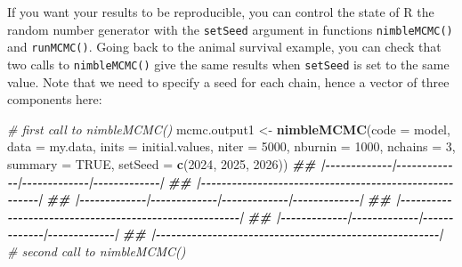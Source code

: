 \documentclass[
  12pt,
]{krantz}
\newenvironment{Shaded}{\begin{snugshade}}{\end{snugshade}}
\newcommand{\AttributeTok}[1]{\textcolor[rgb]{0.13,0.29,0.53}{#1}}
\newcommand{\CommentTok}[1]{\textcolor[rgb]{0.56,0.35,0.01}{\textit{#1}}}
\newcommand{\ConstantTok}[1]{\textcolor[rgb]{0.56,0.35,0.01}{#1}}
\newcommand{\DecValTok}[1]{\textcolor[rgb]{0.00,0.00,0.81}{#1}}
\newcommand{\DocumentationTok}[1]{\textcolor[rgb]{0.56,0.35,0.01}{\textbf{\textit{#1}}}}
\newcommand{\FunctionTok}[1]{\textcolor[rgb]{0.13,0.29,0.53}{\textbf{#1}}}
\newcommand{\NormalTok}[1]{#1}
\newcommand{\OtherTok}[1]{\textcolor[rgb]{0.56,0.35,0.01}{#1}}
\begin{document}
If you want your results to be reproducible, you can control the state of R the random number generator with the \texttt{setSeed} argument in functions \texttt{nimbleMCMC()} and \texttt{runMCMC()}. Going back to the animal survival example, you can check that two calls to \texttt{nimbleMCMC()} give the same results when \texttt{setSeed} is set to the same value. Note that we need to specify a seed for each chain, hence a vector of three components here:

\begin{Shaded}
\begin{Highlighting}[]
\CommentTok{\# first call to nimbleMCMC()}
\NormalTok{mcmc.output1 }\OtherTok{\textless{}{-}} \FunctionTok{nimbleMCMC}\NormalTok{(}\AttributeTok{code =}\NormalTok{ model,}
                           \AttributeTok{data =}\NormalTok{ my.data,}
                           \AttributeTok{inits =}\NormalTok{ initial.values,}
                           \AttributeTok{niter =} \DecValTok{5000}\NormalTok{,}
                           \AttributeTok{nburnin =} \DecValTok{1000}\NormalTok{,}
                           \AttributeTok{nchains =} \DecValTok{3}\NormalTok{,}
                           \AttributeTok{summary =} \ConstantTok{TRUE}\NormalTok{,}
                           \AttributeTok{setSeed =} \FunctionTok{c}\NormalTok{(}\DecValTok{2024}\NormalTok{, }\DecValTok{2025}\NormalTok{, }\DecValTok{2026}\NormalTok{))}
\DocumentationTok{\#\# |{-}{-}{-}{-}{-}{-}{-}{-}{-}{-}{-}{-}{-}|{-}{-}{-}{-}{-}{-}{-}{-}{-}{-}{-}{-}{-}|{-}{-}{-}{-}{-}{-}{-}{-}{-}{-}{-}{-}{-}|{-}{-}{-}{-}{-}{-}{-}{-}{-}{-}{-}{-}{-}|}
\DocumentationTok{\#\# |{-}{-}{-}{-}{-}{-}{-}{-}{-}{-}{-}{-}{-}{-}{-}{-}{-}{-}{-}{-}{-}{-}{-}{-}{-}{-}{-}{-}{-}{-}{-}{-}{-}{-}{-}{-}{-}{-}{-}{-}{-}{-}{-}{-}{-}{-}{-}{-}{-}{-}{-}{-}{-}{-}{-}|}
\DocumentationTok{\#\# |{-}{-}{-}{-}{-}{-}{-}{-}{-}{-}{-}{-}{-}|{-}{-}{-}{-}{-}{-}{-}{-}{-}{-}{-}{-}{-}|{-}{-}{-}{-}{-}{-}{-}{-}{-}{-}{-}{-}{-}|{-}{-}{-}{-}{-}{-}{-}{-}{-}{-}{-}{-}{-}|}
\DocumentationTok{\#\# |{-}{-}{-}{-}{-}{-}{-}{-}{-}{-}{-}{-}{-}{-}{-}{-}{-}{-}{-}{-}{-}{-}{-}{-}{-}{-}{-}{-}{-}{-}{-}{-}{-}{-}{-}{-}{-}{-}{-}{-}{-}{-}{-}{-}{-}{-}{-}{-}{-}{-}{-}{-}{-}{-}{-}|}
\DocumentationTok{\#\# |{-}{-}{-}{-}{-}{-}{-}{-}{-}{-}{-}{-}{-}|{-}{-}{-}{-}{-}{-}{-}{-}{-}{-}{-}{-}{-}|{-}{-}{-}{-}{-}{-}{-}{-}{-}{-}{-}{-}{-}|{-}{-}{-}{-}{-}{-}{-}{-}{-}{-}{-}{-}{-}|}
\DocumentationTok{\#\# |{-}{-}{-}{-}{-}{-}{-}{-}{-}{-}{-}{-}{-}{-}{-}{-}{-}{-}{-}{-}{-}{-}{-}{-}{-}{-}{-}{-}{-}{-}{-}{-}{-}{-}{-}{-}{-}{-}{-}{-}{-}{-}{-}{-}{-}{-}{-}{-}{-}{-}{-}{-}{-}{-}{-}|}
\CommentTok{\# second call to nimbleMCMC()}

\end{Highlighting}
\end{Shaded}
\end{document}
